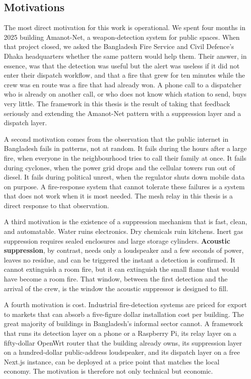 \subsection{Motivations}

The most direct motivation for this work is operational. We spent four months in 2025 building Amanot-Net, a weapon-detection system for public spaces. When that project closed, we asked the Bangladesh Fire Service and Civil Defence's Dhaka headquarters whether the same pattern would help them. Their answer, in essence, was that the detection was useful but the alert was useless if it did not enter their dispatch workflow, and that a fire that grew for ten minutes while the crew was en route was a fire that had already won. A phone call to a dispatcher who is already on another call, or who does not know which station to send, buys very little. The framework in this thesis is the result of taking that feedback seriously and extending the Amanot-Net pattern with a suppression layer and a dispatch layer.

A second motivation comes from the observation that the public internet in Bangladesh fails in patterns, not at random. It fails during the hours after a large fire, when everyone in the neighbourhood tries to call their family at once. It fails during cyclones, when the power grid drops and the cellular towers run out of diesel. It fails during political unrest, when the regulator shuts down mobile data on purpose. A fire-response system that cannot tolerate these failures is a system that does not work when it is most needed. The mesh relay in this thesis is a direct response to that observation.

A third motivation is the existence of a suppression mechanism that is fast, clean, and automatable. Water ruins electronics. Dry chemicals ruin kitchens. Inert gas suppression requires sealed enclosures and large storage cylinders. \textbf{Acoustic suppression}, by contrast, needs only a loudspeaker and a few seconds of power, leaves no residue, and can be triggered the instant a detection is confirmed. It cannot extinguish a room fire, but it can extinguish the small flame that would have become a room fire. That window, between the first detection and the arrival of the crew, is the window the acoustic suppressor is designed to fill.

A fourth motivation is cost. Industrial fire-detection systems are priced for export to markets that can absorb a five-figure dollar installation cost per building. The great majority of buildings in Bangladesh's informal sector cannot. A framework that runs its detection layer on a phone or a Raspberry Pi, its relay layer on a fifty-dollar OpenWrt router that the building already owns, its suppression layer on a hundred-dollar public-address loudspeaker, and its dispatch layer on a free Next.js instance, can be deployed at a price point that matches the local economy. The motivation is therefore not only technical but economic.

